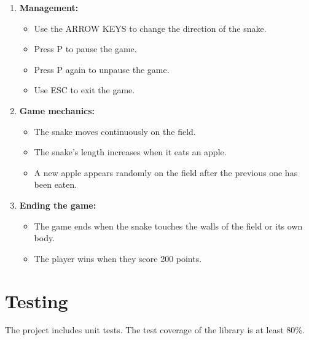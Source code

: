 \documentclass{article}
\begin{document}
\begin{enumerate}
    \item \textbf{Management:}
        \begin{itemize}
            \item Use the ARROW KEYS to change the direction of the snake.
            \item Press P to pause the game.
            \item Press P again to unpause the game.
            \item Use ESC to exit the game.
        \end{itemize}
    \item \textbf{Game mechanics:}
        \begin{itemize}
            \item The snake moves continuously on the field.
            \item The snake's length increases when it eats an apple.
            \item A new apple appears randomly on the field after the previous one has been eaten.
        \end{itemize}
    \item \textbf{Ending the game:}
        \begin{itemize}
            \item The game ends when the snake touches the walls of the field or its own body.
            \item The player wins when they score 200 points.
        \end{itemize}
\end{enumerate}

\section{Testing}

The project includes unit tests. The test coverage of the library is at least 80\%.
\end{document}
